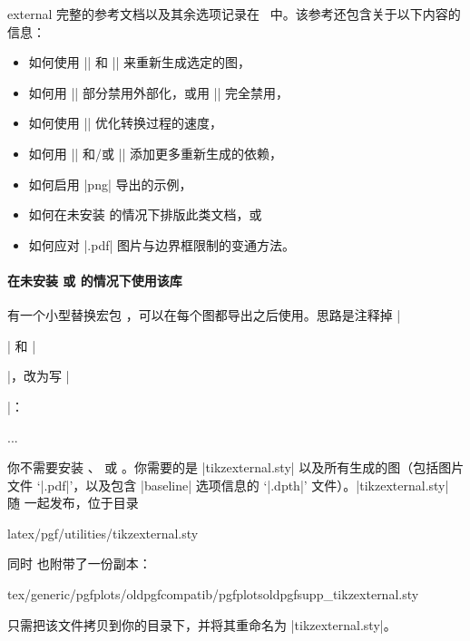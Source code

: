 {\begin{pgfplotslibrary}{external}
    完整的参考文档以及其余选项记录在~\cite[``Externalization Library'']{tikz} 中。该参考还包含关于以下内容的信息：
    \begin{itemize}
        \item 如何使用
            || 和
            || 来重新生成选定的图，
        \item 如何用
            || 部分禁用外部化，或用
            |\tikzexternaldisable| 完全禁用，
        \item 如何使用
            |\tikzset{external/optimize command away=\myExpensiveMacro}| 优化转换过程的速度，
        \item 如何用
            |\tikzpicturedependsonfile| 和/或
            |\tikzexternalfiledependsonfile| 添加更多重新生成的依赖，
        \item 如何启用 |png| 导出的示例，
        \item 如何在未安装 \pgfname{} 的情况下排版此类文档，或
        \item 如何应对 |.pdf| 图片与边界框限制的变通方法。 
    \end{itemize}


    \paragraph{在未安装 {\normalfont\pgfname} 或 {\normalfont\PGFPlots} 的情况下使用该库}

    有一个小型替换宏包 ，可以在每个图都导出之后使用。思路是注释掉 |\usepackage{tikz}| 和 |\usepackage{pgfplots}|，改为写 |\usepackage{tikzexternal}|：
\begin{codeexample}
\usepackage{tikzexternal}
    \tikzexternalize%

...

\end{codeexample}
    你不需要安装 \pgfname{}、\tikzname{} 或 \PGFPlots{}。你需要的是 |tikzexternal.sty| 以及所有生成的图（包括图片文件 `|.pdf|'，以及包含 |baseline| 选项信息的 `|.dpth|' 文件）。|tikzexternal.sty| 随 \pgfname{} 一起发布，位于目录
\begin{codeexample}
latex/pgf/utilities/tikzexternal.sty
\end{codeexample}
    同时 \PGFPlots{} 也附带了一份副本：
\begin{codeexample}
tex/generic/pgfplots/oldpgfcompatib/pgfplotsoldpgfsupp_tikzexternal.sty
\end{codeexample}
    只需把该文件拷贝到你的目录下，并将其重命名为 |tikzexternal.sty|。



\end{pgfplotslibrary}}
